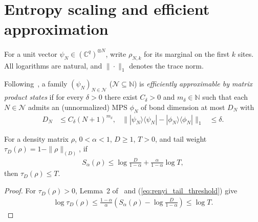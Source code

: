 \section{Entropy scaling and efficient approximation}

For a unit vector $\psi_N\in(\mathbb C^q)^{\otimes N}$, write
$\rho_{N,k}$ for its marginal on the first $k$ sites. All logarithms are
natural, and $\|\cdot\|_1$ denotes the trace norm.

\begin{definition}
    \label{def:efficient_mps_approximation}
    \leanok
    Following~\cite{Schuch2008EntropyScaling}, a family
    $(\psi_N)_{N\in\mathcal N}$ ($\mathcal N\subseteq\mathbb N$) is
    \emph{efficiently approximable by matrix product states} if for every
    $\delta>0$ there exist $C_\delta>0$ and $m_\delta\in\mathbb N$ such that
    each $N\in\mathcal N$ admits an (unnormalized) MPS $\phi_N$ of bond
    dimension at most $D_N$ with
    \begin{align}
        D_N                                    & \le C_\delta(N+1)^{m_\delta}, &
        \bigl\||\psi_N\rangle\langle\psi_N|
        -|\phi_N\rangle\langle\phi_N|\bigr\|_1 & \le\delta.
        \label{eq:efficient_mps_approximation}
    \end{align}
\end{definition}

\begin{lemma}
    \label{thm:renyi_entropy_tail_threshold}
    \leanok
    For a density matrix $\rho$, $0<\alpha<1$, $D\ge1$, $T>0$, and tail weight
    $\tau_D(\rho)=1-\|\rho\|_{(D)}$, if
    \begin{align}
        S_\alpha(\rho)\le
        \log\frac{D}{1-\alpha}+\frac{\alpha}{1-\alpha}\log T,
        \label{eq:renyi_tail_threshold}
    \end{align}
    then $\tau_D(\rho)\le T$.
\end{lemma}
\begin{proof}
    \leanok
    For $\tau_D(\rho)>0$, Lemma~2 of~\cite{VerstraeteCirac2006Faithfully} and
    (\ref{eq:renyi_tail_threshold}) give
    \begin{align}
        \log\tau_D(\rho)
        \le\frac{1-\alpha}{\alpha}
        \left(S_\alpha(\rho)-\log\frac{D}{1-\alpha}\right)
        \le\log T.
        \label{eq:renyi_tail_log_bound}
    \end{align}
\end{proof}


